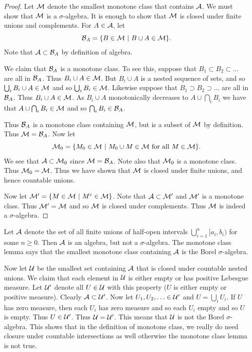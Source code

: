 \documentclass[twoside, a4paper, 10pt]{amsart}
\begin{document}
\begin{proof} Let $\mathcal{M}$ denote the smallest monotone class that contains $\mathcal{A}$. We must show that $\mathcal{M}$ is a $\sigma$-algebra. It is enough to show that $\mathcal{M}$ is closed under finite unions and complements. For $A \in \mathcal{A}$, let $$\mathcal{B}_A = \{B \in \mathcal{M} ~|~ B \cup A \in \mathcal{M}\}.$$ Note that $\mathcal{A} \subset \mathcal{B}_A$ by definition of algebra. 

We claim that $\mathcal{B}_A$ is a monotone class. To see this, suppose that $B_1 \subset B_2 \subset \ldots$ are all in $\mathcal{B}_A$. Thus $B_i \cup A \in \mathcal{M}$. But $B_i \cup A$ is a nested sequence of sets, and so $\bigcup_i B_i \cup A \in \mathcal{M}$ and so $\bigcup_i B_i \in \mathcal{M}$. Likewise suppose that $B_1 \supset B_2 \supset \ldots$ are all in $\mathcal{B}_A$. Thus $B_i \cup A \in \mathcal{M}$. As $B_i \cup A$ monotonically decreases to $A \cup \bigcap_i B_i$ we have that $A \cup \bigcap_i B_i \in \mathcal{M}$ and so $\bigcap_i B_i \in \mathcal{B}_A$.

Thus $\mathcal{B}_A$ is a monotone class containing $\mathcal{M}$, but is a subset of $\mathcal{M}$ by definition. Thus $\mathcal{M} = \mathcal{B}_A$. Now let $$\mathcal{M}_0 = \{ M_0 \in \mathcal{M} ~|~ M_0 \cup M \in \mathcal{M} \text{ for all } M \in \mathcal{M} \}.$$ We see that $\mathcal{A} \subset \mathcal{M}_0$ since $\mathcal{M} = \mathcal{B}_A$. Note also that $\mathcal{M}_0$ is a monotone class. Thus $\mathcal{M}_0 = \mathcal{M}$. Thus we have shown that $\mathcal{M}$ is closed under finite unions, and hence countable unions.

Now let $\mathcal{M}' = \{ M \in \mathcal{M} ~|~ M^c \in \mathcal{M}\}$. Note that $\mathcal{A} \subset \mathcal{M}'$ and $\mathcal{M}'$ is a monotone class. Thus $\mathcal{M}' = \mathcal{M}$ and so $\mathcal{M}$ is closed under complements. Thus $\mathcal{M}$ is indeed a $\sigma$-algebra.

\end{proof}

\begin{eg} Let $\mathcal{A}$ denote the set of all finite unions of half-open intervals $ \bigcup_{i=1}^n [a_i, b_i)$ for some $n \geq 0$. Then $\mathcal{A}$ is an algebra, but not a $\sigma$-algebra. The monotone class lemma says that the smallest monotone class containing $\mathcal{A}$ is the Borel $\sigma$-algebra.

Now let $\mathcal{U}$ be the smallest set containing $\mathcal{A}$ that is closed under countable nested unions. We claim that each element in $\mathcal{U}$ is either empty or has positive Lebesgue measure. Let $\mathcal{U}'$ denote all $U \in \mathcal{U}$ with this property ($U$ is either empty or positive measure). Clearly $\mathcal{A} \subset \mathcal{U}'$. Now let $U_1,U_2,\ldots \in \mathcal{U}'$ and $U = \bigcup_{i}U_i$. If $U$ has zero measure, then each $U_i$ has zero measure and so each $U_i$ empty and so $U$ is empty. Thus $U \in \mathcal{U}'$. Thus $\mathcal{U} = \mathcal{U}'$. This means that $\mathcal{U}$ is not the Borel $\sigma$-algebra. This shows that in the definition of monotone class, we really do need closure under countable intersections as well otherwise the monotone class lemma is not true.

\end{eg}
\end{document}
